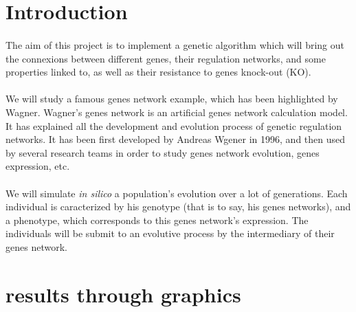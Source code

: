 \documentclass[]{report} %
\title{}
\author{}
\date{}
\begin{document}
        \maketitle %




\section*{Introduction}
	\paragraph*{}
	The aim of this project is to implement a genetic algorithm which will bring out the connexions between different genes, their regulation networks, and some properties linked to, as well as their resistance to genes knock-out (KO).
	\paragraph*{}
	We will study a famous genes network example, which has been highlighted by Wagner. Wagner's genes network is an artificial genes network calculation model. It has explained all the development and evolution process of genetic regulation networks. It has been first developed by Andreas Wgener in 1996, and then used by several research teams in order to study genes network evolution, genes expression, etc.
	\paragraph*{}
	We will simulate \textit{in silico} a population's evolution over a lot of generations. Each individual is caracterized by his genotype (that is to say, his genes networks), and a phenotype, which corresponds to this genes network's expression. The individuals will be submit to an evolutive process by the intermediary of their genes network.

\section*{results through graphics}
\end{document}
